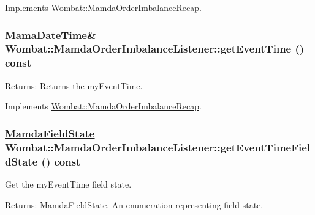Implements \hyperlink{classWombat_1_1MamdaOrderImbalanceRecap_be84e053623cff05c86acfabcb0a77a8}{Wombat::Mamda\-Order\-Imbalance\-Recap}.\hypertarget{classWombat_1_1MamdaOrderImbalanceListener_6cac146703cca68aecfd579f512d8b99}{
\subsubsection[getEventTime]{\setlength{\rightskip}{0pt plus 5cm}Mama\-Date\-Time\& Wombat::Mamda\-Order\-Imbalance\-Listener::get\-Event\-Time () const}}
\label{classWombat_1_1MamdaOrderImbalanceListener_6cac146703cca68aecfd579f512d8b99}


\begin{Desc}
\item[Returns:]Returns the my\-Event\-Time. \end{Desc}


Implements \hyperlink{classWombat_1_1MamdaOrderImbalanceRecap_7ee6f3e229298d61cb56b5780795303b}{Wombat::Mamda\-Order\-Imbalance\-Recap}.\hypertarget{classWombat_1_1MamdaOrderImbalanceListener_b9da1457422c7e005b4d1cb097621e01}{
\subsubsection[getEventTimeFieldState]{\setlength{\rightskip}{0pt plus 5cm}\hyperlink{namespaceWombat_93aac974f2ab713554fd12a1fa3b7d2a}{Mamda\-Field\-State} Wombat::Mamda\-Order\-Imbalance\-Listener::get\-Event\-Time\-Field\-State () const}}
\label{classWombat_1_1MamdaOrderImbalanceListener_b9da1457422c7e005b4d1cb097621e01}


Get the my\-Event\-Time field state. 

\begin{Desc}
\item[Returns:]Mamda\-Field\-State. An enumeration representing field state. \end{Desc}


